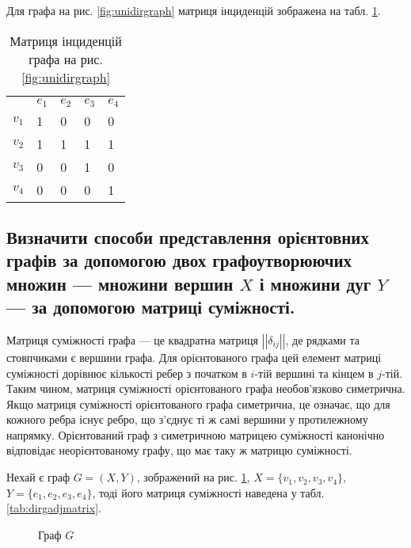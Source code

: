 \documentclass[a4paper,oneside,DIV=12,fontsize=12pt, headings=small]{scrartcl}
\begin{document}
			Для графа на рис. \ref{fig:unidirgraph} матриця інциденцій зображена на табл. \ref{tab:unidirinctable}.
			
			\begin{table}[h!]
				\centering
				
				\begin{tabular}{lllll}
					\toprule
					      & $e_1$ & $e_2$ & $e_3$ & $e_4$\\
					$v_1$ & 1     & 0     & 0     & 0    \\
					$v_2$ & 1     & 1     & 1     & 1    \\
					$v_3$ & 0     & 0     & 1     & 0    \\
					$v_4$ & 0     & 0     & 0     & 1    \\
					\bottomrule
				\end{tabular}
				
				\caption{Матриця інциденцій графа на рис. \ref{fig:unidirgraph}}
				\label{tab:unidirinctable}
			\end{table}
			
		\subsection{Визначити способи представлення орієнтовних графів за допомогою двох графоутворюючих множин --- множини вершин $X$ і множини дуг $Y$ --- за допомогою матриці суміжності.}
			Матриця суміжності графа --- це квадратна матриця $\left|\left|\delta_{ij}\right|\right|$, де рядками та стовпчиками є вершини графа. Для орієнтованого графа цей елемент матриці суміжності дорівнює кількості ребер з початком в $i$-тій вершині та кінцем в $j$-тій. Таким чином, матриця суміжності орієнтованого графа необов'язково симетрична. Якщо матриця суміжності орієнтованого графа симетрична, це означає, що для кожного ребра існує ребро, що з'єднує ті ж самі вершини у протилежному напрямку. Орієнтований граф з симетричною матрицею суміжності канонічно відповідає неорієнтованому графу, що має таку ж матрицю суміжності.
			
			Нехай є граф $G = (X, Y)$, зображений на рис. \ref{fig:dirgraph}, $X = \{v_1, v_2, v_3, v_4\}$, $Y = \{e_1, e_2, e_3, e_4\}$, тоді його матриця суміжності наведена у табл. \ref{tab:dirgadjmatrix}.
			
			\begin{figure}[h!]
				\centering
				
				
				\caption{Граф $G$}
				\label{fig:dirgraph}
			\end{figure}
			
\end{document}
